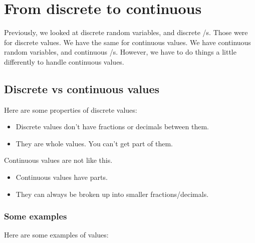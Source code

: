 \documentclass[../../../main.tex]{subfiles}
\begin{document}
\chapter{From discrete to continuous}

Previously, we looked at discrete random variables, and discrete \PDFtext/s. Those were for discrete values. We have the same for continuous values. We have continuous random variables, and continuous \PDFtext/s. However, we have to do things a little differently to handle continuous values.


\section{Discrete vs continuous values}

Here are some properties of discrete values:

\begin{itemize}
  \item Discrete values don't have fractions or decimals between them.
  \item They are whole values. You can't get part of them.
\end{itemize}

Continuous values are not like this. 

\begin{itemize}
  \item Continuous values have parts.
  \item They can always be broken up into smaller fractions/decimals.
\end{itemize}


\subsection{Some examples}

Here are some examples of  values: 
\end{document}
